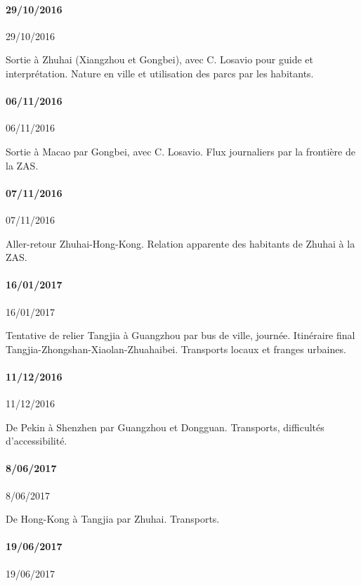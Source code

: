 



\paragraph{29/10/2016}{29/10/2016}

Sortie à Zhuhai (Xiangzhou et Gongbei), avec C. Losavio pour guide et interprétation. Nature en ville et utilisation des parcs par les habitants.


\paragraph{06/11/2016}{06/11/2016}

Sortie à Macao par Gongbei, avec C. Losavio. Flux journaliers par la frontière de la ZAS.


\paragraph{07/11/2016}{07/11/2016}

Aller-retour Zhuhai-Hong-Kong. Relation apparente des habitants de Zhuhai à la ZAS.

\paragraph{16/01/2017}{16/01/2017}

Tentative de relier Tangjia à Guangzhou par bus de ville, journée. Itinéraire final Tangjia-Zhongshan-Xiaolan-Zhuahaibei. Transports locaux et franges urbaines.


\paragraph{11/12/2016}{11/12/2016}

De Pekin à Shenzhen par Guangzhou et Dongguan. Transports, difficultés d'accessibilité.


\paragraph{8/06/2017}{8/06/2017}

De Hong-Kong à Tangjia par Zhuhai. Transports.


\paragraph{19/06/2017}{19/06/2017}

